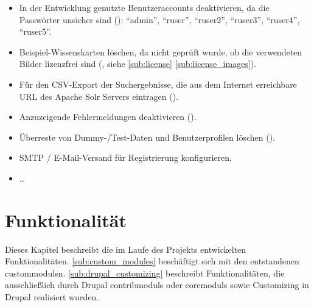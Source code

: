 \begin{itemize}
	\item In der Entwicklung genutzte Benutzeraccounts deaktivieren, da die Passwörter unsicher sind (): \enquote{admin}, \enquote{ruser}, \enquote{ruser2}, \enquote{ruser3}, \enquote{ruser4}, \enquote{ruser5}.

	\item Beispiel-Wissenskarten löschen, da nicht geprüft wurde, ob die verwendeten Bilder lizenzfrei sind (, siehe \cref*{sub:license} \cref{sub:license_images}).

	\item Für den CSV-Export der Suchergebnisse, die aus dem Internet erreichbare URL des Apache Solr Servers eintragen ().

	\item Anzuzeigende Fehlermeldungen deaktivieren ().
	
	\item Überreste von Dummy-/Test-Daten und Benutzerprofilen löschen ().
	
	\item SMTP / E-Mail-Versand für Registrierung konfigurieren.
	
	\item \dots {}

\end{itemize}



\newpage
\section{Funktionalität}\label{sec:function}
Dieses Kapitel beschreibt die im Laufe des Projekts entwickelten Funktionalitäten. \cref{sub:custom_modules} beschäftigt sich mit den entstandenen \glspl{custommodul}n. \cref{sub:drupal_customizing} beschreibt Funktionalitäten, die ausschließlich durch Drupal \glspl{contribmodul} oder \glspl{coremodul} sowie Customizing in Drupal realisiert wurden.

